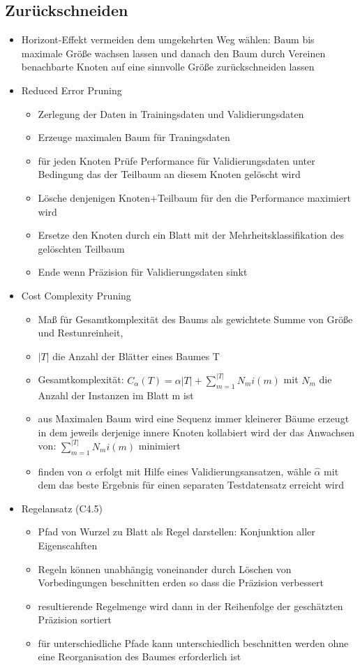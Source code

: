 \documentclass{article} %
\begin{document}
	\subsection{Zurückschneiden}
	\begin{itemize}
		\item Horizont-Effekt vermeiden dem umgekehrten Weg wählen: Baum bis maximale Größe wachsen lassen und danach den Baum durch Vereinen benachbarte Knoten auf eine sinnvolle Größe zurückschneiden lassen
		\item Reduced Error Pruning
		\begin{itemize}
			\item Zerlegung der Daten in Trainingsdaten und Validierungsdaten
			\item Erzeuge maximalen Baum für Traningsdaten
			\item für jeden Knoten Prüfe Performance für Validierungsdaten unter Bedingung das der Teilbaum an diesem Knoten gelöscht wird
			\item Lösche denjenigen Knoten+Teilbaum für den die Performance maximiert wird
			\item Ersetze den Knoten durch ein Blatt mit der Mehrheitsklassifikation des gelöschten Teilbaum
			\item Ende wenn Präzision für Validierungsdaten sinkt
		\end{itemize}
		\item Cost Complexity Pruning
		\begin{itemize}
			\item Maß für Gesamtkomplexität des Baums als gewichtete Summe von Größe und Restunreinheit,
			\item $|T|$ die Anzahl der Blätter eines Baumes T
			\item Gesamtkomplexität: $C_\alpha(T) = \alpha|T| + \sum_{m=1}^{|T|}N_m i(m)$ mit $N_m$ die Anzahl der Instanzen im Blatt m ist
			\item aus Maximalen Baum wird eine Sequenz immer kleinerer Bäume erzeugt in dem jeweils derjenige innere Knoten kollabiert wird der das Anwachsen von: $\sum_{m=1}^{|T|}N_m i(m)$ minimiert
			\item finden von $\alpha$ erfolgt mit Hilfe eines Validierungsansatzen, wähle $\hat{\alpha}$ mit dem das beste Ergebnis für einen separaten Testdatensatz erreicht wird
		\end{itemize}    
		\item Regelansatz (C4.5)
		\begin{itemize}
			\item Pfad von Wurzel zu Blatt als Regel darstellen: Konjunktion aller Eigenscahften
			\item Regeln können unabhängig voneinander durch Löschen von Vorbedingungen beschnitten erden so dass die Präzision verbessert
			\item resultierende Regelmenge wird dann in der Reihenfolge der geschätzten Präzision sortiert
			\item für unterschiedliche Pfade kann unterschiedlich beschnitten werden ohne eine Reorganisation des Baumes erforderlich ist
		\end{itemize}
	\end{itemize}
\end{document}
